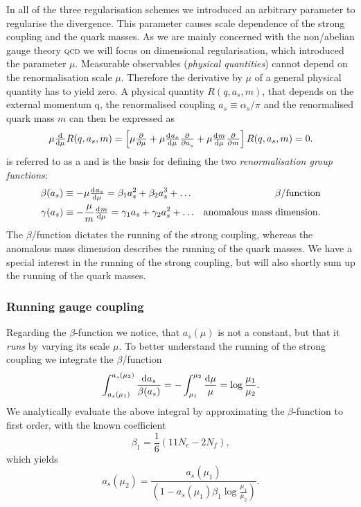 \documentclass[../../index.tex]{subfiles}
\begin{document}
In all of the three regularisation schemes we introduced an arbitrary parameter
to regularise the divergence. This parameter causes scale dependence of the
strong coupling and the quark masses. As we are mainly concerned with the
non\-/abelian gauge theory \textsc{qcd} we will focus on dimensional
regularisation, which introduced the parameter \(\mu\). Measurable observables
(\textit{physical quantities}) cannot depend on the renormalisation scale
\(\mu\). Therefore the derivative by \(\mu\) of a general physical quantity has
to yield zero. A physical quantity \(R(q, a_s, m)\), that depends on the
external momentum q, the renormalised coupling \(a_s\equiv\alpha_s/\pi\) and the
renormalised quark mass \(m\) can then be expressed as
\begin{equation}
  \label{eq:RGE}
  \mu \od{}{\mu}R(q, a_s, m) =
  \left[ \mu \pd{}{\mu} + \mu \od{a_s}{\mu} \pd{}{a_s} + \mu \od{m}{\mu} \pd{}{m} \right] R(q, a_s, m) = 0.
\end{equation}
 is referred to as a 
and is the basis for defining the two \textit{renormalisation group functions}:
\begin{align}
  \beta(a_s) &\equiv -\mu \od{a_s}{\mu} = \beta_1 a_s^2 + \beta_2 a_s^3 + \dots & \beta\text{\-/function}
                                                                                  \label{eq:betaFunction} \\
  \gamma(a_s) &\equiv - \frac{\mu}{m} \od{m}{\mu} = \gamma_1 a_s + \gamma_2 a_s^2 + \dots & \text{anomalous mass dimension}.
                                                                                            \label{eq:anomalousMassDimension}
\end{align}
The \(\beta\)\-/function dictates the running of the strong coupling, whereas
the anomalous mass dimension describes the running of the quark masses. We have
a special interest in the running of the strong coupling, but will also shortly
sum up the running of the quark masses.

\subsubsection{Running gauge coupling}
Regarding the \(\beta\)-function we notice, that \(a_s(\mu)\) is not a constant,
but that it \textit{runs} by varying its scale \(\mu\). To better understand the
running of the strong coupling we integrate the \(\beta\)\-/function
\begin{equation}
  \int_{a_s(\mu_1)}^{a_s(\mu_2)}\frac{\dif a_s}{\beta(a_s)} = - \int_{\mu_1}^{\mu_2} \frac{\dif \mu}{\mu} = \log \frac{\mu_1}{\mu_2}.
\end{equation}
We analytically evaluate the above integral by approximating the
\(\beta\)-function to first order, with the known coefficient
\begin{equation}
  \label{eq:firstBetaCoefficient}
  \beta_1 = \frac{1}{6}(11 N_c - 2 N_f),
\end{equation}
which yields
\begin{equation}
  \label{eq:strongCouplingFirstOrder}
  a_s(\mu_2) = \frac{a_s(\mu_1)}{\left( 1 - a_s(\mu_1) \beta_1 \log\frac{\mu_1}{\mu_2} \right)}.
\end{equation}
\end{document}
